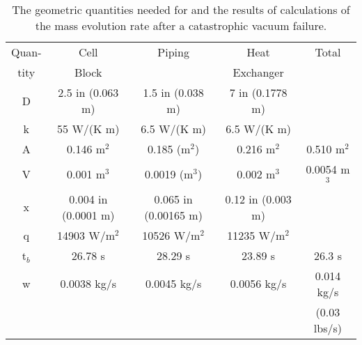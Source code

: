 \begin{table}[htb]
\begin{center}
\begin{tabular}{|c|c|c|c|c|} \hline
Quan- & Cell  & Piping & Heat      & Total \\ 
tity  & Block &        & Exchanger &   
 \\ \hline
D & 2.5 in (0.063 m) & 1.5 in (0.038 m) &7 in (0.1778 m) & \\ \hline
k & 55 W/(K m) & 6.5 W/(K m) & 6.5 W/(K m) & \\ \hline
A & 0.146 m$^2$ & 0.185 (m$^2$) & 0.216 m$^2$ & 0.510 m$^2$ \\ \hline
V & 0.001 m$^3$ & 0.0019 (m$^3$) &0.002 m$^3$ & 0.0054 m$^3$ \\ \hline
x & 0.004 in (0.0001 m) &  0.065 in (0.00165 m) & 0.12 in (0.003 m) & \\ \hline
q & 14903 W/m$^2$ & 10526 W/m$^2$ & 11235 W/m$^2$ & \\ \hline
t$_{b}$ & 26.78 s & 28.29 s & 23.89 s & 26.3 s \\ \hline
w & 0.0038 kg/s & 0.0045 kg/s & 0.0056 kg/s & 0.014 kg/s \\
& & & &  (0.03 lbs/s) \\ \hline 
\end{tabular}
\end{center}
\caption[Cryotarget: Volumes and Geometry]{ The geometric quantities needed for and the results
of calculations of the mass evolution rate after a catastrophic vacuum
failure.} 
\label{ta:geo}
\end{table}

